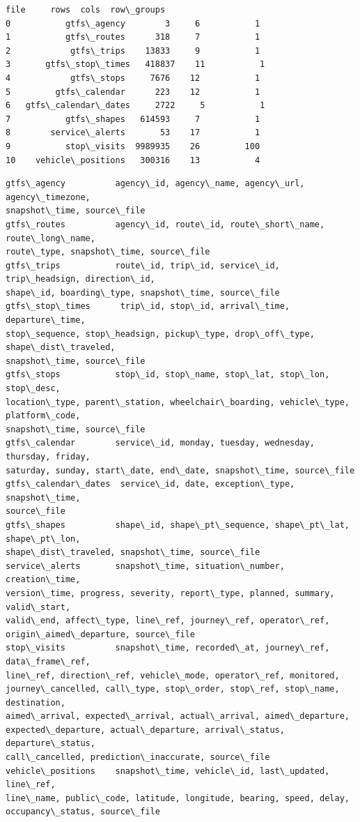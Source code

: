 \documentclass[11pt]{article}
\begin{document}
    
    \begin{Verbatim}[commandchars=\\\{\}]
                   file     rows  cols  row\_groups
0           gtfs\_agency        3     6           1
1           gtfs\_routes      318     7           1
2            gtfs\_trips    13833     9           1
3       gtfs\_stop\_times   418837    11           1
4            gtfs\_stops     7676    12           1
5         gtfs\_calendar      223    12           1
6   gtfs\_calendar\_dates     2722     5           1
7           gtfs\_shapes   614593     7           1
8        service\_alerts       53    17           1
9           stop\_visits  9989935    26         100
10    vehicle\_positions   300316    13           4
    \end{Verbatim}

    
    \begin{Verbatim}[commandchars=\\\{\}]
gtfs\_agency          agency\_id, agency\_name, agency\_url, agency\_timezone,
snapshot\_time, source\_file
gtfs\_routes          agency\_id, route\_id, route\_short\_name, route\_long\_name,
route\_type, snapshot\_time, source\_file
gtfs\_trips           route\_id, trip\_id, service\_id, trip\_headsign, direction\_id,
shape\_id, boarding\_type, snapshot\_time, source\_file
gtfs\_stop\_times      trip\_id, stop\_id, arrival\_time, departure\_time,
stop\_sequence, stop\_headsign, pickup\_type, drop\_off\_type, shape\_dist\_traveled,
snapshot\_time, source\_file
gtfs\_stops           stop\_id, stop\_name, stop\_lat, stop\_lon, stop\_desc,
location\_type, parent\_station, wheelchair\_boarding, vehicle\_type, platform\_code,
snapshot\_time, source\_file
gtfs\_calendar        service\_id, monday, tuesday, wednesday, thursday, friday,
saturday, sunday, start\_date, end\_date, snapshot\_time, source\_file
gtfs\_calendar\_dates  service\_id, date, exception\_type, snapshot\_time,
source\_file
gtfs\_shapes          shape\_id, shape\_pt\_sequence, shape\_pt\_lat, shape\_pt\_lon,
shape\_dist\_traveled, snapshot\_time, source\_file
service\_alerts       snapshot\_time, situation\_number, creation\_time,
version\_time, progress, severity, report\_type, planned, summary, valid\_start,
valid\_end, affect\_type, line\_ref, journey\_ref, operator\_ref,
origin\_aimed\_departure, source\_file
stop\_visits          snapshot\_time, recorded\_at, journey\_ref, data\_frame\_ref,
line\_ref, direction\_ref, vehicle\_mode, operator\_ref, monitored,
journey\_cancelled, call\_type, stop\_order, stop\_ref, stop\_name, destination,
aimed\_arrival, expected\_arrival, actual\_arrival, aimed\_departure,
expected\_departure, actual\_departure, arrival\_status, departure\_status,
call\_cancelled, prediction\_inaccurate, source\_file
vehicle\_positions    snapshot\_time, vehicle\_id, last\_updated, line\_ref,
line\_name, public\_code, latitude, longitude, bearing, speed, delay,
occupancy\_status, source\_file
    \end{Verbatim}
\end{document}
